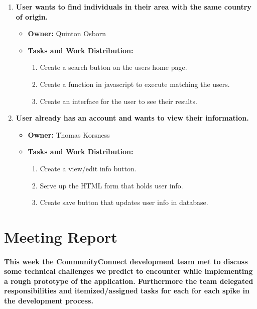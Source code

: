 \documentclass[12pt]{article}
\begin{document}
\begin{enumerate}
    \item \textbf{User wants to find individuals in their area with the same country of origin.}
      \begin{itemize}
        \item \textbf{Owner:} Quinton Osborn
        \item \textbf{Tasks and Work Distribution:}
          \begin{enumerate}
            \item Create a search button on the users home page.
            \item Create a function in javascript to execute matching the users.
            \item Create an interface for the user to see their results.
          \end{enumerate}
      \end{itemize}

    \item \textbf{User already has an account and wants to view their information.}
      \begin{itemize}
        \item \textbf{Owner:}  Thomas Korsness
        \item \textbf{Tasks and Work Distribution:}
          \begin{enumerate}
            \item Create a view/edit info button.
            \item Serve up the HTML form that holds user info.
            \item Create save button that updates user info in database.
          \end{enumerate}
      \end{itemize}

  \end{enumerate}

\section{\bf Meeting Report}

\paragraph{\normalfont \indent This week the CommunityConnect development team met to discuss some technical challenges we predict to encounter while implementing a rough prototype of the application. Furthermore the team delegated responsibilities and itemized/assigned tasks for each for each spike in the development process.
}
\end{document}
